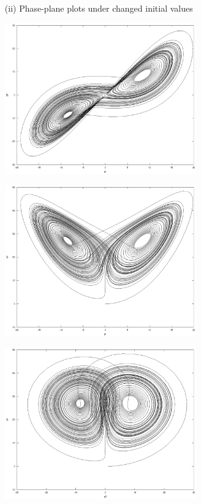 \documentclass[11pt,a4paper]{article}
\begin{document}
\begin{enumerate}
\begin{enumerate}
	\item[(ii)] Phase-plane plots under changed initial values
	\begin{center}
		\includegraphics[width=0.65\textwidth]{pp1s.eps}
	\end{center}
	\begin{center}
		\includegraphics[width=0.65\textwidth]{pp2s.eps}
	\end{center}
	\begin{center}
		\includegraphics[width=0.65\textwidth]{pp3s.eps}
	\end{center}
	

\end{enumerate}
\end{enumerate}
\end{document}
